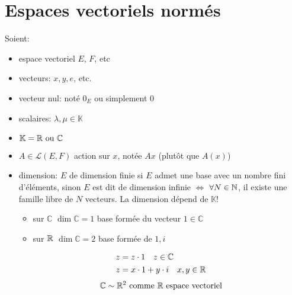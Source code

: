 \chapter{Espaces vectoriels normés}
Soient:
\begin{itemize}
    \item espace vectoriel $E$,  $F$, etc
    \item vecteurs:  $x, y, e$, etc.
    \item vecteur nul: noté  $0_E$ ou simplement  $0$
    \item scalaires:  $\lambda, \mu \in \mathbb{K}$
    \item  $\mathbb{K} = \mathbb{R} \text{ ou } \mathbb{C}$
    \item $A \in \mathcal{L}(E, F)$ action sur $x$, notée  $Ax$ (plutôt que $A(x)$)
    \item dimension: $E$ de dimension finie si  $E$ admet une base avec un nombre fini d'éléments, sinon  $E$ est dit de dimension infinie  $\iff$ $\forall N \in \mathbb{N}$, il existe une famille libre de $N$ vecteurs. La dimension dépend de  $\mathbb{K}$!
         \begin{itemize}
             \item sur $\mathbb{C}$  $\dim \mathbb{C} = 1$ base formée du vecteur  $1 \in \mathbb{C}$
             \item sur  $\mathbb{R}$ $\dim \mathbb{C} = 2$ base formée de $1, i$
        \end{itemize}
        \begin{align*}
            &z = z \cdot 1 \quad z \in \mathbb{C}\\
            &z = x \cdot 1 + y \cdot i \quad x, y \in \mathbb{R}
        \end{align*}
        \[
            \mathbb{C} \sim \mathbb{R}^2 \text{ comme } \mathbb{R} \text{ espace vectoriel}
        \] 
\end{itemize}

